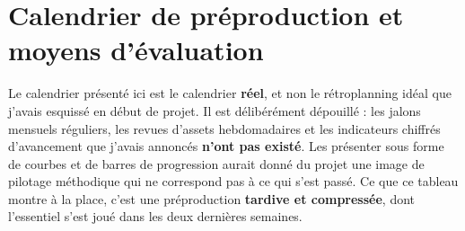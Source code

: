 \documentclass[11pt,a4paper]{report}
\begin{document}
\section{Calendrier de préproduction et moyens d'évaluation}
Le calendrier présenté ici est le calendrier \textbf{réel}, et non le rétroplanning idéal que j'avais
esquissé en début de projet. Il est délibérément dépouillé : les jalons mensuels réguliers, les
revues d'assets hebdomadaires et les indicateurs chiffrés d'avancement que j'avais annoncés
\textbf{n'ont pas existé}. Les présenter sous forme de courbes et de barres de progression aurait
donné du projet une image de pilotage méthodique qui ne correspond pas à ce qui s'est passé.
Ce que ce tableau montre à la place, c'est une préproduction \textbf{tardive et compressée}, dont
l'essentiel s'est joué dans les deux dernières semaines.
\end{document}
